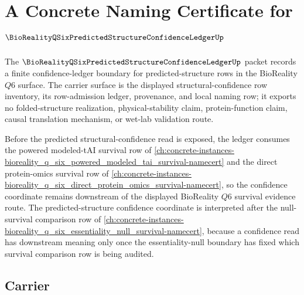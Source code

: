 \chapter{A Concrete Naming Certificate for $\BioRealityQSixPredictedStructureConfidenceLedgerUp$}
\label{ch:concrete-instances-bioreality_q_six_predicted_structure_confidence_ledger-namecert}

The $\BioRealityQSixPredictedStructureConfidenceLedgerUp$ packet records a finite confidence-ledger boundary for predicted-structure rows in the BioReality $Q6$ surface. The carrier surface is the displayed structural-confidence row inventory, its row-admission ledger, provenance, and local naming row; it exports no folded-structure realization, physical-stability claim, protein-function claim, causal translation mechanism, or wet-lab validation route.

Before the predicted structural-confidence read is exposed, the ledger consumes the powered modeled-tAI survival row of \autoref{ch:concrete-instances-bioreality_q_six_powered_modeled_tai_survival-namecert} and the direct protein-omics survival row of \autoref{ch:concrete-instances-bioreality_q_six_direct_protein_omics_survival-namecert}, so the confidence coordinate remains downstream of the displayed BioReality $Q6$ survival evidence route. The predicted-structure confidence coordinate is interpreted after the null-survival comparison row of \autoref{ch:concrete-instances-bioreality_q_six_essentiality_null_survival-namecert}, because a confidence read has downstream meaning only once the essentiality-null boundary has fixed which survival comparison row is being audited.



\section{Carrier}

